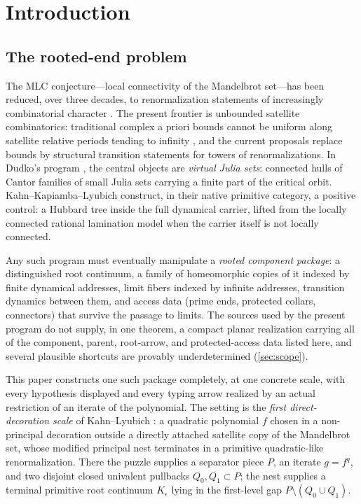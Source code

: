 \documentclass[11pt,reqno]{amsart}
\numberwithin{equation}{section}
\theoremstyle{plain}
\theoremstyle{definition}
\theoremstyle{remark}
\newcommand{\rootK}{K_{\epsilon}}
\begin{document}
\maketitle
\tableofcontents

\section{Introduction}
\label{sec:intro}

\subsection{The rooted-end problem}

The MLC conjecture---local connectivity of the Mandelbrot set---has been
reduced, over three decades, to renormalization statements of increasingly
combinatorial character
\cite{DH85,Hubbard93,Lyubich97,KahnPrimitive06,KLDecorations08,
KLPrincipal09,KKL26}.  The present frontier is unbounded satellite
combinatorics: traditional complex a priori bounds cannot be uniform
along satellite relative periods tending to infinity \cite{BLOT22}, and
the current proposals replace bounds by structural transition statements
for towers of renormalizations.  In Dudko's program \cite{Dudko25}, the
central objects are \emph{virtual Julia sets}: connected hulls of Cantor
families of small Julia sets carrying a finite part of the critical
orbit.  Kahn--Kapiamba--Lyubich \cite{KKL26} construct, in their native
primitive category, a positive control: a Hubbard tree inside the full
dynamical carrier, lifted from the locally connected rational
lamination model when the carrier itself is not locally connected.

Any such program must eventually manipulate a \emph{rooted component
package}: a distinguished root continuum, a family of homeomorphic copies
of it indexed by finite dynamical addresses, limit fibers indexed by
infinite addresses, transition dynamics between them, and access data
(prime ends, protected collars, connectors) that survive the passage to
limits.  The sources used by the present program do not supply, in one
theorem, a compact planar realization carrying all of the component,
parent, root-arrow, and protected-access data listed here, and several
plausible shortcuts are provably underdetermined (\cref{sec:scope}).

This paper constructs one such package completely, at one concrete scale,
with every hypothesis displayed and every typing arrow realized by an
actual restriction of an iterate of the polynomial.  The setting is the
\emph{first direct-decoration scale} of Kahn--Lyubich
\cite{KLDecorations08,KLPrincipal09}: a quadratic polynomial $f$ chosen in
a non-principal decoration outside a directly attached satellite copy of
the Mandelbrot set, whose modified principal nest terminates in a
primitive quadratic-like renormalization.  There the puzzle supplies a
separator piece $P$, an iterate $g=f^q$, and two disjoint closed
univalent pullbacks $Q_0,Q_1\subset P$; the nest supplies a terminal
primitive root continuum $\rootK$ lying in the first-level gap
$P\setminus(Q_0\cup Q_1)$.
\end{document}
